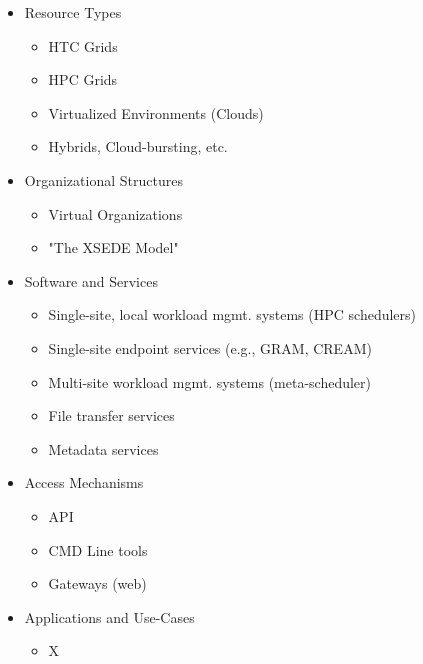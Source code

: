 \documentclass{sig-alternate}
\begin{document}
\begin{itemize}

    \item Resource Types

        \begin{itemize}
            \item HTC Grids
            \item HPC Grids
            \item Virtualized Environments (Clouds)
            \item Hybrids, Cloud-bursting, etc.
        \end{itemize}

    \item Organizational Structures

        \begin{itemize}
            \item Virtual Organizations
            \item "The XSEDE Model"
        \end{itemize}

    \item Software and Services 

        \begin{itemize}
            \item Single-site, local workload mgmt. systems (HPC schedulers)
            \item Single-site endpoint services (e.g., GRAM, CREAM)
            \item Multi-site workload mgmt. systems (meta-scheduler)
            \item File transfer services
            \item Metadata services
        \end{itemize}

    \item Access Mechanisms

        \begin{itemize}
    	    \item API 
            \item CMD Line tools
            \item Gateways (web)
        \end{itemize}

    \item Applications and Use-Cases

        \begin{itemize}
            \item X
        \end{itemize}

\end{itemize}
\end{document}
